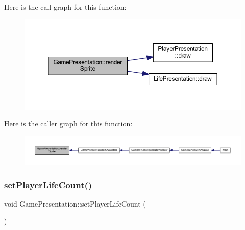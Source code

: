 Here is the call graph for this function\+:\nopagebreak
\begin{figure}[H]
\begin{center}
\leavevmode
\includegraphics[width=350pt]{class_game_presentation_ae2a317ddda3f666fdb1ca4f4c68f6b49_cgraph}
\end{center}
\end{figure}
Here is the caller graph for this function\+:\nopagebreak
\begin{figure}[H]
\begin{center}
\leavevmode
\includegraphics[width=350pt]{class_game_presentation_ae2a317ddda3f666fdb1ca4f4c68f6b49_icgraph}
\end{center}
\end{figure}
\mbox{\label{class_game_presentation_a5a329f0403011b464c26218eeff38606}} 
\subsubsection{\texorpdfstring{set\+Player\+Life\+Count()}{setPlayerLifeCount()}}
{\footnotesize\ttfamily void Game\+Presentation\+::set\+Player\+Life\+Count (\begin{DoxyParamCaption}{ }\end{DoxyParamCaption})}

